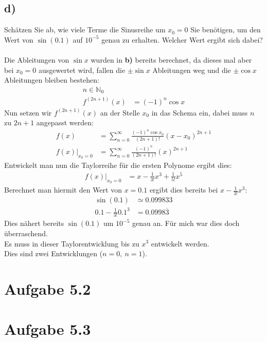 \documentclass{theozettel}
\begin{document}
\subsection*{d)}Schätzen Sie ab, wie viele Terme die Sinusreihe um $x_0=0$ Sie benötigen, um den Wert von $\sin\left(0.1\right)$ auf $10^{-5}$ genau zu erhalten. Welcher Wert ergibt sich dabei?\\\\
Die Ableitungen von $\sin x$ wurden in \textbf{b)} bereits berechnet, da dieses mal aber bei $x_0=0$ ausgewertet wird, fallen die $\pm\sin x$ Ableitungen weg und die $\pm\cos x$ Ableitungen bleiben bestehen: 
\begin{align*}
n\in\mathbb{N}_0\\
f^{\left(2n+1\right)}\left(x\right)&=\left(-1\right)^n\cos x
\end{align*}
Nun setzen wir $f^{\left(2n+1\right)}\left(x\right)$ an der Stelle $x_0$ in das Schema ein, dabei muss $n$ zu $2n+1$ angepasst werden:
\begin{align*}
f\left(x\right)&=\sum_{n=0}^\infty \frac{\left(-1\right)^n\cos x_0}{\left(2n+1\right)!}\left(x-x_0\right)^{2n+1}\\
f\left(x\right)\big|_{x_0=0}&=\sum_{n=0}^\infty \frac{\left(-1\right)^n}{\left(2n+1\right)!}\left(x\right)^{2n+1}
\end{align*}
Entwickelt man nun die Taylorreihe für die ersten Polynome ergibt dies:
\begin{align*}
f\left(x\right)\big|_{x_0=0}&=x-\frac{1}{3!}x^3+\frac{1}{5!}x^5
\end{align*}
Berechnet man hiermit den Wert von $x=0.1$ ergibt dies bereits bei $x-\frac{1}{3!}x^3$:
\begin{align*}
\sin\left(0.1\right)&\simeq 0.099833\\
0.1-\frac{1}{3!}0.1^3&=0.0998\overline{3}
\end{align*}
Dies nähert bereits $\sin\left(0.1\right)$ um $10^{-5}$ genau an. Für mich war dies doch überraschend.\\
Es muss in dieser Taylorentwicklung bis zu $x^3$ entwickelt werden.\\
Dies sind zwei Entwicklungen ($n=0, \ n=1$).




\section*{Aufgabe 5.2}




\section*{Aufgabe 5.3}
\end{document}
